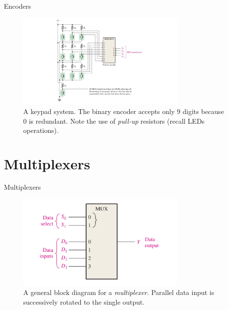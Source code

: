 \documentclass{beamer}
\begin{document}
\begin{frame}{Encoders}
\begin{figure}
\centering
\includegraphics[width=0.75\textwidth,trim=3cm 0cm 3cm 0cm,clip=true]{figures/encoder2.pdf}
\caption{\label{fig:encoder2} A keypad system.  The binary encoder accepts only 9 digits because 0 is redundant.  Note the use of \textit{pull-up} resistors (recall LEDs operations).}
\end{figure}
\end{frame}

\section{Multiplexers}

\begin{frame}{Multiplexers}
\begin{figure}
\centering
\includegraphics[width=0.75\textwidth,trim=3cm 0cm 3cm 0cm,clip=true]{figures/mux1.pdf}
\caption{\label{fig:mux1} A general block diagram for a \textit{multiplexer.}  Parallel data input is successively rotated to the single output.}
\end{figure}
\end{frame}
\end{document}
